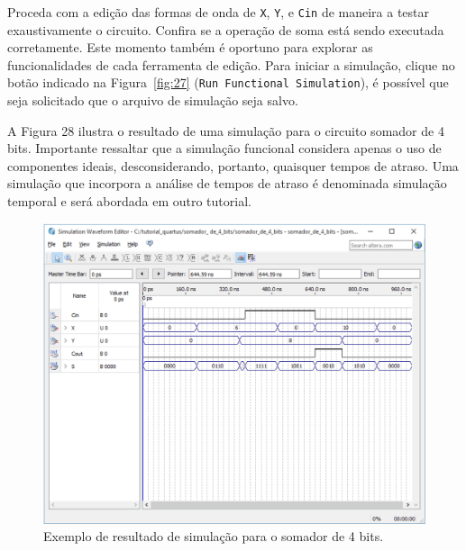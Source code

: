 \documentclass[12pt,a4paper]{article}
\begin{document}
Proceda com a edição das formas de onda de \texttt{X}, \texttt{Y}, e \texttt{Cin} de maneira a testar exaustivamente o circuito. Confira se a operação de soma está sendo executada corretamente. Este momento também é oportuno para explorar as funcionalidades de cada ferramenta de edição. Para iniciar a simulação, clique no botão indicado na Figura~\ref{fig:27} (\texttt{Run Functional Simulation}), é possível que seja solicitado que o arquivo de simulação seja salvo.

A Figura 28 ilustra o resultado de uma simulação para o circuito somador de 4 bits. Importante ressaltar que a simulação funcional considera apenas o uso de componentes ideais, desconsiderando, portanto, quaisquer tempos de atraso. Uma simulação que incorpora a análise de tempos de atraso é denominada simulação temporal e será abordada em outro tutorial.

\begin{figure}[htbp!]
    \centering
    \includegraphics[width=\textwidth]{./figs/fig28.png}
    \caption{Exemplo de resultado de simulação para o somador de 4 bits.}
    \label{fig:28}
\end{figure}

\newpage
\end{document}

